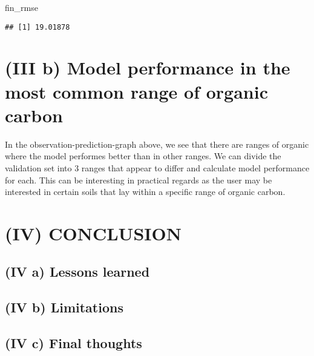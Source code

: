 \documentclass[
]{article}
\newenvironment{Shaded}{\begin{snugshade}}{\end{snugshade}}
\newcommand{\NormalTok}[1]{#1}
\begin{document}
\begin{Shaded}
\begin{Highlighting}[]
\NormalTok{fin\_rmse}
\end{Highlighting}
\end{Shaded}

\begin{verbatim}
## [1] 19.01878
\end{verbatim}

\hypertarget{iii-b-model-performance-in-the-most-common-range-of-organic-carbon}{%
\section{(III b) Model performance in the most common range of organic
carbon}\label{iii-b-model-performance-in-the-most-common-range-of-organic-carbon}}

In the observation-prediction-graph above, we see that there are ranges
of organic where the model performes better than in other ranges. We can
divide the validation set into 3 ranges that appear to differ and
calculate model performance for each. This can be interesting in
practical regards as the user may be interested in certain soils that
lay within a specific range of organic carbon.

\hypertarget{iv-conclusion}{%
\section{(IV) CONCLUSION}\label{iv-conclusion}}

\hypertarget{iv-a-lessons-learned}{%
\subsection{(IV a) Lessons learned}\label{iv-a-lessons-learned}}

\hypertarget{iv-b-limitations}{%
\subsection{(IV b) Limitations}\label{iv-b-limitations}}

\hypertarget{iv-c-final-thoughts}{%
\subsection{(IV c) Final thoughts}\label{iv-c-final-thoughts}}

\newpage
\end{document}
